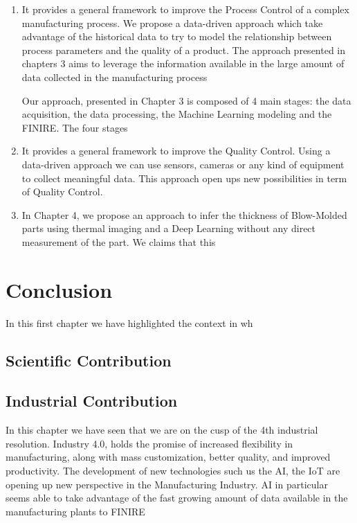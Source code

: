 \begin{enumerate}
    \item It provides a general framework to improve the Process Control of a complex manufacturing process. We propose a data-driven approach which take advantage of the historical data to try to model the relationship between process parameters and the quality of a product. The approach presented in chapters 3 aims to leverage the information available in the large amount of data collected in the manufacturing process 
    
    Our approach, presented in Chapter 3 is composed of 4 main stages: the data acquisition, the data processing, the Machine Learning modeling and the FINIRE. The four stages 
    \item It provides a general framework to improve the Quality Control. Using a data-driven approach we can use sensors, cameras or any kind of equipment to collect meaningful data. This approach open ups new possibilities in term of Quality Control.  
    \item In Chapter 4, we propose an approach to infer the thickness of Blow-Molded parts using thermal imaging and a Deep Learning without any direct measurement of the part. We claims that this    
\end{enumerate}


\section{Conclusion}

In this first chapter we have highlighted the context in wh

\subsection{Scientific Contribution}

\subsection{Industrial Contribution}

In this chapter we have seen that we are on the cusp of the 4th industrial resolution. Industry 4.0, holds the promise of increased flexibility in manufacturing, along with mass customization, better quality, and improved productivity. The development of new technologies such us the AI, the IoT are opening up new perspective in the Manufacturing Industry. AI in particular seems able to take advantage of the fast growing amount of data available in the manufacturing plants to FINIRE 
